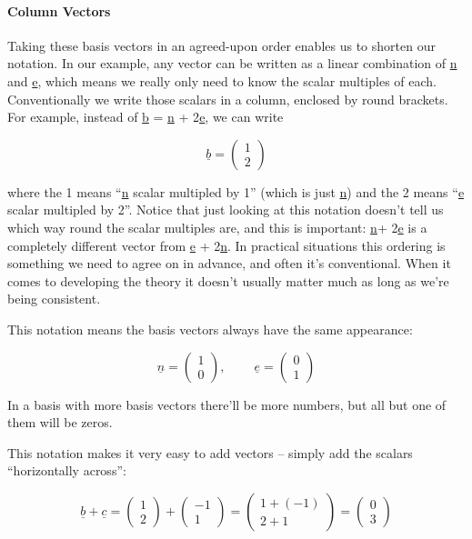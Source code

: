 \documentclass[oneside,english]{amsbook}
\numberwithin{section}{chapter}
\theoremstyle{plain}
\theoremstyle{definition}
\begin{document}
\paragraph{Column Vectors}

Taking these basis vectors in an agreed-upon order enables us to shorten
our notation. In our example, any vector can be written as a linear
combination of \ul{n} and \ul{e}, which means we really only need to
know the scalar multiples of each. Conventionally we write those scalars
in a column, enclosed by round brackets. For example, instead of \ul{b}
= \ul{n} + 2\ul{e}, we can write

\[\underline{b} = \begin{pmatrix}
	1 \\
	2
\end{pmatrix}\]

where the 1 means ``\ul{n} scalar multipled by 1'' (which is just
\ul{n}) and the 2 means ``\ul{e} scalar multipled by 2''. Notice that
just looking at this notation doesn't tell us which way round the scalar
multiples are, and this is important: \ul{n}+ 2\ul{e} is a completely
different vector from \ul{e} + 2\ul{n}. In practical situations this
ordering is something we need to agree on in advance, and often it's
conventional. When it comes to developing the theory it doesn't usually
matter much as long as we're being consistent.

This notation means the basis vectors always have the same appearance:

\[\underline{n} = \begin{pmatrix}
	1 \\
	0
\end{pmatrix},\ \ \ \ \ \ \ \ \ \ \underline{e} = \begin{pmatrix}
	0 \\
	1
\end{pmatrix}\]

In a basis with more basis vectors there'll be more numbers, but all but
one of them will be zeros.

This notation makes it very easy to add vectors -- simply add the
scalars ``horizontally across'':

\[\underline{b} + \underline{c} = \begin{pmatrix}
	1 \\
	2
\end{pmatrix} + \begin{pmatrix}
	- 1 \\
	1
\end{pmatrix} = \begin{pmatrix}
	1 + ( - 1) \\
	2 + 1
\end{pmatrix} = \begin{pmatrix}
	0 \\
	3
\end{pmatrix}\]
\end{document}
